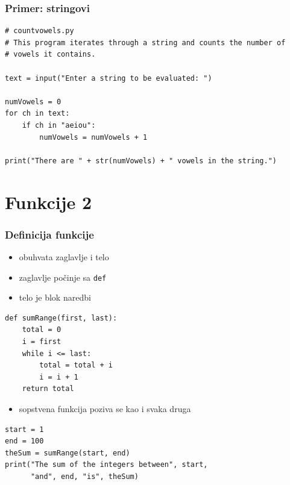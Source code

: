 \documentclass[compress]{beamer}
\begin{document}
\begin{frame}[fragile]
\frametitle{Primer: stringovi}
\begin{verbatim}
# countvowels.py
# This program iterates through a string and counts the number of
# vowels it contains.

text = input("Enter a string to be evaluated: ")

numVowels = 0
for ch in text:
    if ch in "aeiou":
        numVowels = numVowels + 1
     
print("There are " + str(numVowels) + " vowels in the string.")
\end{verbatim}
\end{frame}

\section{Funkcije 2}

\begin{frame}[fragile]
\frametitle{Definicija funkcije}
\begin{itemize}
  \item obuhvata zaglavlje i telo
  \item zaglavlje počinje sa \texttt{def}
  \item telo je blok naredbi
\end{itemize}
\begin{verbatim}
def sumRange(first, last):
    total = 0
    i = first
    while i <= last:
        total = total + i
        i = i + 1
    return total
\end{verbatim}
\begin{itemize}
  \item sopstvena funkcija poziva se kao i svaka druga
\end{itemize}
\begin{verbatim}
start = 1
end = 100
theSum = sumRange(start, end)
print("The sum of the integers between", start,
      "and", end, "is", theSum)
\end{verbatim}
\end{frame}
\end{document}
